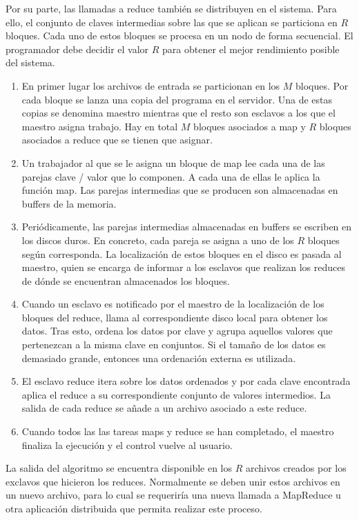 \documentclass[10pt]{article}
\begin{document}
		Por su parte, las llamadas a reduce también se distribuyen en el sistema. Para ello, el conjunto de claves intermedias sobre las que se aplican se particiona en $R$ bloques. Cada uno de estos bloques se procesa en un nodo de forma secuencial. El programador debe decidir el valor $R$ para obtener el mejor rendimiento posible del sistema.

		\begin{enumerate}
			\item En primer lugar los archivos de entrada se particionan en los $M$ bloques. Por cada bloque se lanza una copia del programa en el servidor. Una de estas copias se denomina maestro mientras que el resto son esclavos a los que el maestro asigna trabajo. Hay en total $M$ bloques asociados a map y $R$ bloques asociados a reduce que se tienen que asignar.
			\item Un trabajador al que se le asigna un bloque de map lee cada una de las parejas clave / valor que lo componen. A cada una de ellas le aplica la función map. Las parejas intermedias que se producen son almacenadas en buffers de la memoria.
			\item Periódicamente, las parejas intermedias almacenadas en buffers se escriben en los discos duros. En concreto, cada pareja se asigna a uno de los $R$ bloques según corresponda. La localización de estos bloques en el disco es pasada al maestro, quien se encarga de informar a los esclavos que realizan los reduces de dónde se encuentran almacenados los bloques.
			\item Cuando un esclavo es notificado por el maestro de la localización de los bloques del reduce, llama al correspondiente disco local para obtener los datos. Tras esto, ordena los datos por clave y agrupa aquellos valores que pertenezcan a la misma clave en conjuntos. Si el tamaño de los datos es demasiado grande, entonces una ordenación externa es utilizada.
			\item El esclavo reduce itera sobre los datos ordenados y por cada clave encontrada  aplica el reduce a su correspondiente conjunto de valores intermedios. La salida de cada reduce se añade a un archivo asociado a este reduce.
			\item Cuando todos las las tareas maps y reduce se han completado, el maestro finaliza la ejecución y el control vuelve al usuario. 
		\end{enumerate}

		La salida del algoritmo se encuentra disponible en los $R$ archivos creados por los exclavos que hicieron los reduces. Normalmente se deben unir estos archivos en un nuevo archivo, para lo cual se requeriría una nueva llamada a MapReduce u otra aplicación distribuida que permita realizar este proceso.
		
\end{document}
